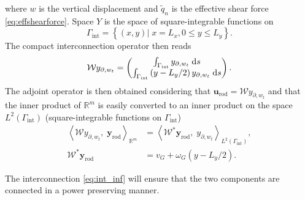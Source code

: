 where $w$ is the vertical displacement and $\widetilde{q}_n$ is the effective shear force \eqref{eq:effshearforce}. Space $Y$ is the space of square-integrable functions on
$$\Gamma_{\text{int}} = \left\{ (x,y) \vert \; x=L_x, 0 \le y \le L_y  \right\}.$$ The compact interconnection operator then reads
\begin{equation}\label{eq:intKP_infdim}
\mathcal{W} y_{\partial, w_t} = \begin{pmatrix}
\int_{\Gamma_{\text{int}}} y_{\partial, w_t} \d{s} \\
\int_{\Gamma_{\text{int}}} \left( y - L_y/2 \right) y_{\partial, w_t} \d{s} \\
\end{pmatrix}.
\end{equation}
The adjoint operator is then obtained considering that $\mathbf{u}_{\text{rod}} = \mathcal{W} y_{\partial, w_t}$ and that the inner product of $\mathbb{R}^m$ is easily converted to an inner product on the space $L^2(\Gamma_{\text{int}})$ (square-integrable functions on $\Gamma_{\text{int}}$)
\begin{align*}
\left\langle \mathcal{W} y_{\partial, w_t}, \; \mathbf{y}_{\text{rod}} \right\rangle_{\mathbb{R}^m} &= \left\langle \mathcal{W}^* \mathbf{y}_{\text{rod}} , \; y_{\partial, w_t} \right\rangle_{L^2(\Gamma_{\text{int}})}, \\
\mathcal{W}^* \mathbf{y}_{\text{rod}} &= v_G + \omega_{G} \left( y - L_y/2 \right).
\end{align*}

The interconnection \eqref{eq:int_inf} will ensure that the two components are connected in a power preserving manner.

